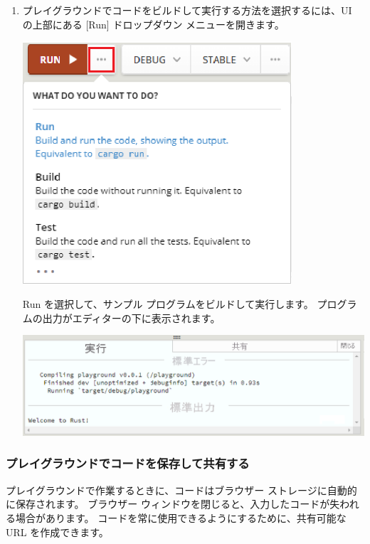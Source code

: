 \begin{enumerate}
\item プレイグラウンドでコードをビルドして実行する方法を選択するには、UI の上部にある [Run] ドロップダウン メニューを開きます。

\includegraphics[width=10cm]{rust-playground-run.eps}

\item [Run] を選択して、サンプル プログラムをビルドして実行します。 プログラムの出力がエディターの下に表示されます。

\includegraphics[width=14cm]{rust-playground-print.eps}

\end{enumerate}

\subsubsection{プレイグラウンドでコードを保存して共有する}

プレイグラウンドで作業するときに、コードはブラウザー ストレージに自動的に保存されます。 ブラウザー ウィンドウを閉じると、入力したコードが失われる場合があります。 コードを常に使用できるようにするために、共有可能な URL を作成できます。

